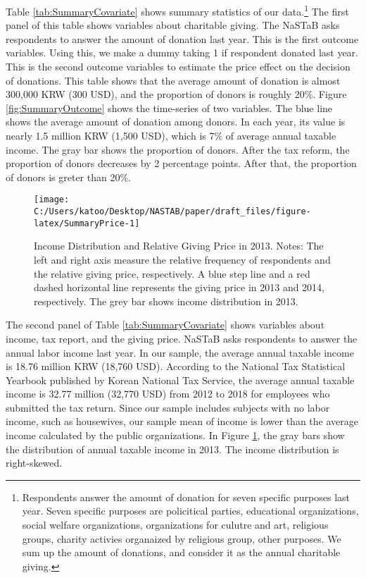 \documentclass[
  11pt,
  a4paper,
]{article}
\begin{document}
Table \ref{tab:SummaryCovariate}
shows summary statistics of our data.\footnote{Respondents answer the amount of donation for seven specific purposes last year. Seven specific purposes are policitical parties, educational organizations, social welfare organizations, organizations for culutre and art, religious groups, charity activies organaized by religious group, other purposes. We sum up the amount of donations, and consider it as the annual charitable giving.}
The first panel of this table shows variables about charitable giving.
The NaSTaB asks respondents to answer the amount of donation last year.
This is the first outcome variables.
Using this, we make a dummy taking 1 if respondent donated last year.
This is the second outcome variables to
estimate the price effect on the decision of donations.
This table shows that
the average amount of donation is almost 300,000 KRW (300 USD),
and the proportion of donors is roughly 20\%.
Figure \ref{fig:SummaryOutcome} shows the time-series of two variables.
The blue line shows the average amount of donation among donors.
In each year, its value is nearly 1.5 million KRW (1,500 USD),
which is 7\% of average annual taxable income.
The gray bar shows the proportion of donors.
After the tax reform, the proportion of donors decreases
by 2 percentage points.
After that, the proportion of donors is greter than 20\%.

\begin{figure}[t]

{\centering \texttt{[image: C:/Users/katoo/Desktop/NASTAB/paper/draft\_files/figure-latex/SummaryPrice-1]} 

}

\caption{Income Distribution and Relative Giving Price in 2013. Notes: The left and right axis measure the relative frequency of respondents and the relative giving price, respectively. A blue step line and a red dashed horizontal line represents the giving price in 2013 and 2014, respectively. The grey bar shows income distribution in 2013.}\label{fig:SummaryPrice}
\end{figure}

The second panel of Table \ref{tab:SummaryCovariate}
shows variables about income, tax report, and the giving price.
NaSTaB asks respondents to answer the annual labor income last year.
In our sample,
the average annual taxable income is 18.76 million KRW (18,760 USD).
According to the National Tax Statistical Yearbook
published by Korean National Tax Service,
the average annual taxable income is
32.77 million (32,770 USD) from 2012 to 2018
for employees who submitted the tax return.
Since our sample includes subjects with no labor income, such as housewives,
our sample mean of income is lower than
the average income calculated by the public organizations.
In Figure \ref{fig:SummaryPrice},
the gray bars show the distribution of annual taxable income in 2013.
The income distribution is right-skewed.
\end{document}
